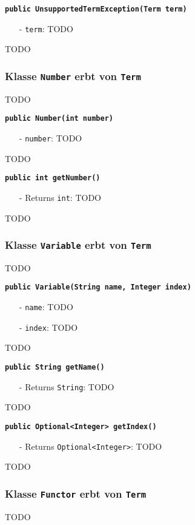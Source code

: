 \documentclass[parskip=full,11pt,twoside]{scrartcl}
\begin{document}
\textbf{\texttt{public UnsupportedTermException(Term term)}}
\begin{itemize}[noitemsep]
	\item[-] \texttt{term}: TODO
\end{itemize}
TODO

\subsubsection{Klasse \texttt{Number} erbt von \texttt{Term}}
TODO

\textbf{\texttt{public Number(int number)}}
\begin{itemize}[noitemsep]
	\item[-] \texttt{number}: TODO
\end{itemize}
TODO

\textbf{\texttt{public int getNumber()}}
\begin{itemize}[noitemsep]
	\item[-] Returns \texttt{int}: TODO
\end{itemize}
TODO

\subsubsection{Klasse \texttt{Variable} erbt von \texttt{Term}}
TODO

\textbf{\texttt{public Variable(String name, Integer index)}}
\begin{itemize}[noitemsep]
	\item[-] \texttt{name}: TODO
	\item[-] \texttt{index}: TODO
\end{itemize}
TODO

\textbf{\texttt{public String getName()}}
\begin{itemize}[noitemsep]
	\item[-] Returns \texttt{String}: TODO
\end{itemize}
TODO

\textbf{\texttt{public Optional<Integer> getIndex()}}
\begin{itemize}[noitemsep]
	\item[-] Returns \texttt{Optional<Integer>}: TODO
\end{itemize}
TODO

\subsubsection{Klasse \texttt{Functor} erbt von \texttt{Term}}
TODO
\end{document}

